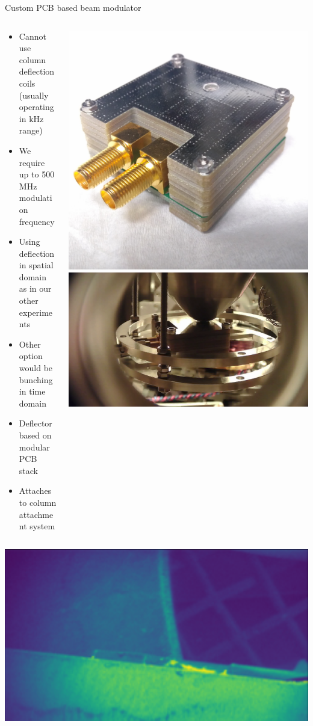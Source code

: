 \documentclass[final]{beamer}
\begin{document}
\begin{frame}[fragile]{}
\begin{columns}[T]
\begin{column}{.49\linewidth}
	\begin{block}{\Large Custom PCB based beam modulator}
		\begin{columns}
			\begin{column}{0.45\columnwidth}
				\begin{itemize}
					\item Cannot use column deflection coils (usually operating in kHz range)
					\item We require up to 500 MHz modulation frequency
					\item Using deflection in spatial domain as in our other experiments
					\item Other option would be bunching in time domain
					\item Deflector based on modular PCB stack
					\item Attaches to column attachment system
				\end{itemize}
			\end{column}
			\begin{column}{0.45\columnwidth}
				\includegraphics[width=0.49\columnwidth]{./figures/kicker2_02.jpg}
				\includegraphics[width=0.49\columnwidth]{./figures/colattach03.png}
			\end{column}
		\end{columns}
		\vspace{1cm}
		\begin{columns}
			\begin{column}{0.45\columnwidth}
				\includegraphics[width=0.49\columnwidth]{./figures/kickertest01.png}

\end{column}
\end{columns}
\end{block}
\end{column}
\end{columns}
\end{frame}
\end{document}
